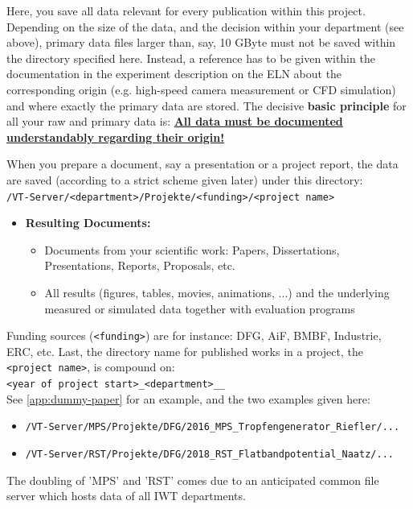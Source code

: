 Here, you save all data relevant for every publication within this project.
Depending on the size of the data, and the decision within your department (see
above), primary data files larger than, say, 10 GByte must not be saved within
the directory specified here. Instead, a reference has to be given within the
documentation in the experiment description on the ELN about the corresponding
origin (e.g. high-speed camera measurement or CFD simulation) and where exactly
the primary data are stored. The decisive \textbf{basic principle} for all your
raw and primary data is:
\textbf{\underline{All data must be documented understandably regarding their origin!}}

When you prepare a document, say a presentation or a project report, the data
are saved (according to a strict scheme given later) under this directory: \\
\texttt{/VT-Server/<department>/Projekte/<funding>/<project name>}
\begin{itemize}
  \item[$\rightarrow$] \textbf{Resulting Documents:}
    \begin{itemize}
      \item Documents from your scientific work: Papers, Dissertations,
            Presentations, Reports, Proposals, etc.
      \item All results (figures, tables, movies, animations, ...) and the
            underlying measured or simulated data together with evaluation
            programs
    \end{itemize}
\end{itemize}
Funding sources (\texttt{<funding>}) are for instance: DFG, AiF, BMBF,
Industrie, ERC, etc. Last, the directory name for published works in a project,
the \texttt{<project name>}, is compound on: \\
\texttt{<year of project start>\_<department>\_<project handle>\_<family name>} \\
See \autoref{app:dummy-paper} for an example, and the two examples given here:



\begin{itemize}
  \item \texttt{/VT-Server/MPS/Projekte/DFG/2016\_MPS\_Tropfengenerator\_Riefler/...}
  \item \texttt{/VT-Server/RST/Projekte/DFG/2018\_RST\_Flatbandpotential\_Naatz/...}
\end{itemize}
The doubling of 'MPS' and 'RST' comes due to an anticipated common file server
which hosts data of all IWT departments.

